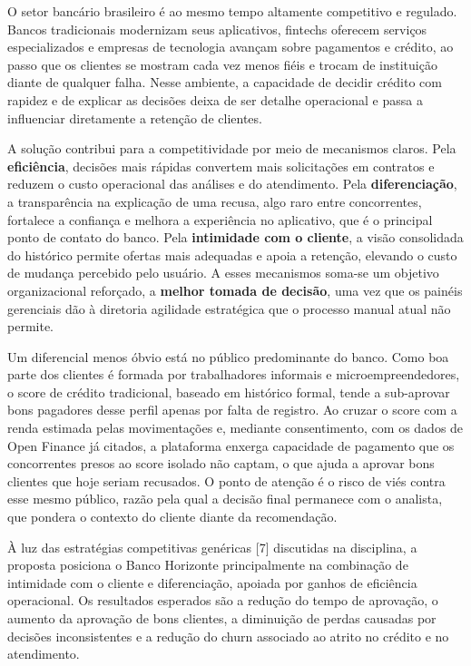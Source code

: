 \documentclass[12pt,a4paper]{article}
\begin{document}
O setor banc\'ario brasileiro \'e ao mesmo tempo altamente competitivo e regulado. Bancos tradicionais modernizam seus aplicativos, fintechs oferecem servi\c{c}os especializados e empresas de tecnologia avan\c{c}am sobre pagamentos e cr\'edito, ao passo que os clientes se mostram cada vez menos fi\'eis e trocam de institui\c{c}\~ao diante de qualquer falha. Nesse ambiente, a capacidade de decidir cr\'edito com rapidez e de explicar as decis\~oes deixa de ser detalhe operacional e passa a influenciar diretamente a reten\c{c}\~ao de clientes.

A solu\c{c}\~ao contribui para a competitividade por meio de mecanismos claros. Pela \textbf{efici\^encia}, decis\~oes mais r\'apidas convertem mais solicita\c{c}\~oes em contratos e reduzem o custo operacional das an\'alises e do atendimento. Pela \textbf{diferencia\c{c}\~ao}, a transpar\^encia na explica\c{c}\~ao de uma recusa, algo raro entre concorrentes, fortalece a confian\c{c}a e melhora a experi\^encia no aplicativo, que \'e o principal ponto de contato do banco. Pela \textbf{intimidade com o cliente}, a vis\~ao consolidada do hist\'orico permite ofertas mais adequadas e apoia a reten\c{c}\~ao, elevando o custo de mudan\c{c}a percebido pelo usu\'ario. A esses mecanismos soma-se um objetivo organizacional refor\c{c}ado, a \textbf{melhor tomada de decis\~ao}, uma vez que os pain\'eis gerenciais d\~ao \`a diretoria agilidade estrat\'egica que o processo manual atual n\~ao permite.

Um diferencial menos \'obvio est\'a no p\'ublico predominante do banco. Como boa parte dos clientes \'e formada por trabalhadores informais e microempreendedores, o score de cr\'edito tradicional, baseado em hist\'orico formal, tende a sub-aprovar bons pagadores desse perfil apenas por falta de registro. Ao cruzar o score com a renda estimada pelas movimenta\c{c}\~oes e, mediante consentimento, com os dados de Open Finance j\'a citados, a plataforma enxerga capacidade de pagamento que os concorrentes presos ao score isolado n\~ao captam, o que ajuda a aprovar bons clientes que hoje seriam recusados. O ponto de aten\c{c}\~ao \'e o risco de vi\'es contra esse mesmo p\'ublico, raz\~ao pela qual a decis\~ao final permanece com o analista, que pondera o contexto do cliente diante da recomenda\c{c}\~ao.

\`A luz das estrat\'egias competitivas gen\'ericas [7] discutidas na disciplina, a proposta posiciona o Banco Horizonte principalmente na combina\c{c}\~ao de intimidade com o cliente e diferencia\c{c}\~ao, apoiada por ganhos de efici\^encia operacional. Os resultados esperados s\~ao a redu\c{c}\~ao do tempo de aprova\c{c}\~ao, o aumento da aprova\c{c}\~ao de bons clientes, a diminui\c{c}\~ao de perdas causadas por decis\~oes inconsistentes e a redu\c{c}\~ao do churn associado ao atrito no cr\'edito e no atendimento.
\end{document}
